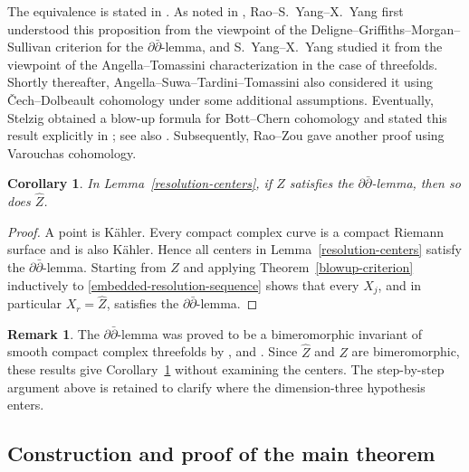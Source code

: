 \documentclass[11pt]{amsart}
\numberwithin{equation}{section}
\theoremstyle{plain}
\newtheorem{cor}[thm]{Corollary}
\theoremstyle{definition}
\newtheorem{rem}[thm]{Remark}
\begin{document}
The equivalence is stated in \cite[Proposition 3.3]{Mn21}.  As noted in
\cite[Remark 3.4]{Mn21}, Rao--S.~Yang--X.~Yang
\cite[Theorem 1.6]{RYY19}\cite[Theorem 1.2]{RYY20} first understood this
proposition from the viewpoint of the Deligne--Griffiths--Morgan--Sullivan
criterion for the $\partial\bar\partial$-lemma, and S.~Yang--X.~Yang
\cite[Theorem 1.3]{YY20} studied it from the viewpoint of the
Angella--Tomassini characterization in the case of threefolds.  Shortly
thereafter, Angella--Suwa--Tardini--Tomassini
\cite[Theorem 13]{ASTT20} also considered it using \v{C}ech--Dolbeault
cohomology under some additional assumptions.  Eventually, Stelzig
obtained a blow-up formula for Bott--Chern cohomology and stated this result
explicitly in \cite[Corollary 1.40]{Se18}; see also \cite[\S~5]{Se21}.
Subsequently, Rao--Zou \cite[Corollary 5.4]{RZ24} gave another proof
using Varouchas cohomology.

\begin{cor}\label{resolution-preserves-ddbar}
In Lemma~\ref{resolution-centers}, if $Z$ satisfies the
$\partial\bar\partial$-lemma, then so does $\widehat Z$.
\end{cor}

\begin{proof}
A point is K\"ahler.  Every compact complex curve is a compact Riemann surface
and is also K\"ahler.  Hence all centers in Lemma~\ref{resolution-centers}
satisfy the $\partial\bar\partial$-lemma.  Starting from $Z$ and applying
Theorem~\ref{blowup-criterion} inductively to
\eqref{embedded-resolution-sequence}
shows that every $X_j$, and in particular $X_r=\widehat Z$, satisfies the
$\partial\bar\partial$-lemma.
\end{proof}

\begin{rem}\label{bimeromorphic-alternative}
The $\partial\bar\partial$-lemma was proved to be a bimeromorphic invariant of
smooth compact complex threefolds by 
\cite[Theorem 1.3]{YY20}, \cite[Corollary 1.40]{Se18} and \cite[Corollary 5.4]{RZ24}.  Since
$\widehat Z$ and $Z$ are
bimeromorphic, these results give
Corollary~\ref{resolution-preserves-ddbar} without examining the centers.  The
step-by-step argument above is retained to clarify where the
dimension-three hypothesis enters.
\end{rem}
\subsection{Construction and proof of the main theorem}
\label{proof-section}
\end{document}
